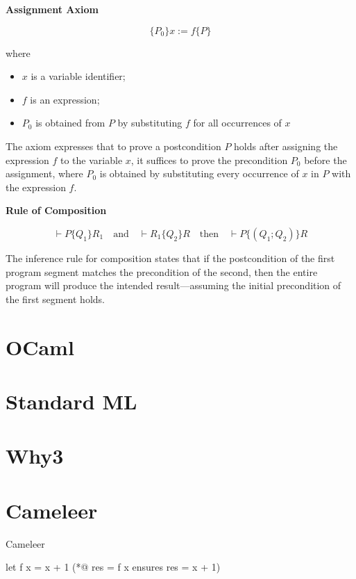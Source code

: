 \textbf{Assignment Axiom}

\[ \{P_0\} x := f \{P\} \]

where
\begin{itemize}
  \item{$x$ is a variable identifier;}
  \item{$f$ is an expression;}
  \item{$P_0$ is obtained from $P$ by substituting $f$ for all occurrences of $x$}
\end{itemize}

The axiom expresses that to prove a postcondition $P$ holds after assigning the expression $f$ to the variable $x$,
it suffices to prove the precondition $P_0$ before the assignment, where $P_0$ is obtained by substituting every occurrence of
$x$ in $P$ with the expression $f$.

\textbf{Rule of Composition}

\[ \vdash P\{Q_1\}R_1 \quad \text{and} \quad \vdash R_1\{Q_2\}R \quad \text{then} \quad \vdash P\{(Q_1 ; Q_2)\}R \]

The inference rule for composition states that if the postcondition of the first program segment matches the precondition 
of the second, then the entire program will produce the intended result—assuming the initial precondition of the first 
segment holds.




\section{OCaml}
\label{sec:OCaml}


\section{Standard ML}
\label{sec:Standard_ML}


\section{Why3}
\label{sec:Why3}

\section{Cameleer}
\label{sec:Cameleer}

Cameleer ~\cite{PereiraR20}

\begin{gospell}
  let f x = x + 1 (*@ res = f x ensures res = x + 1)
\end{gospell}